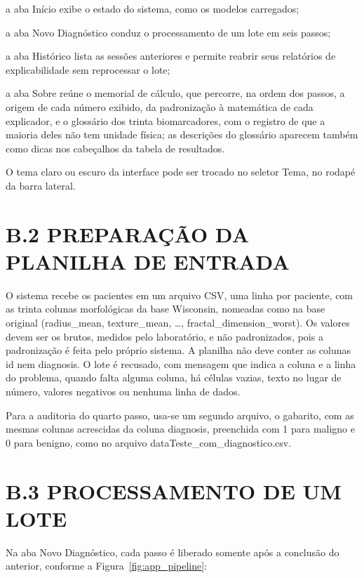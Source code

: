\documentclass[
    12pt
    ,oneside
    ,a4paper
    ,chapter=TITLE
    ,section=TITLE
    ,sumario=abnt-6027-2012
    ,english,brazil]{abntex2} %
\begin{document}
\begin{alineas}
    \item a aba Início exibe o estado do sistema, como os modelos carregados;
    \item a aba Novo Diagnóstico conduz o processamento de um lote em seis
          passos;
    \item a aba Histórico lista as sessões anteriores e permite reabrir seus
          relatórios de explicabilidade sem reprocessar o lote;
    \item a aba Sobre reúne o memorial de cálculo, que percorre, na ordem dos
          passos, a origem de cada número exibido, da padronização à
          matemática de cada explicador, e o glossário dos trinta
          biomarcadores, com o registro de que a maioria deles não tem
          unidade física; as descrições do glossário aparecem também como
          dicas nos cabeçalhos da tabela de resultados.
\end{alineas}

O tema claro ou escuro da interface pode ser trocado no seletor Tema, no rodapé
da barra lateral.

\section*{B.2 PREPARAÇÃO DA PLANILHA DE ENTRADA}

O sistema recebe os pacientes em um arquivo CSV, uma linha por paciente, com as
trinta colunas morfológicas da base Wisconsin, nomeadas como na base original
(radius\_mean, texture\_mean, \ldots, fractal\_dimension\_worst). Os valores
devem ser os brutos, medidos pelo laboratório, e não padronizados, pois a
padronização é feita pelo próprio sistema. A planilha não deve conter as colunas
id nem diagnosis. O lote é recusado, com mensagem que indica a coluna e a linha
do problema, quando falta alguma coluna, há células vazias, texto no lugar de
número, valores negativos ou nenhuma linha de dados.

Para a auditoria do quarto passo, usa-se um segundo arquivo, o gabarito, com as
mesmas colunas acrescidas da coluna diagnosis, preenchida com 1 para maligno e
0 para benigno, como no arquivo dataTeste\_com\_diagnostico.csv.

\section*{B.3 PROCESSAMENTO DE UM LOTE}

Na aba Novo Diagnóstico, cada passo é liberado somente após a conclusão do
anterior, conforme a Figura~\ref{fig:app_pipeline}:
\end{document}
